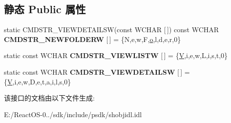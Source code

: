\subsection*{静态 Public 属性}
\begin{DoxyCompactItemize}
\item 
\mbox{\label{interface_i_context_menu_a5d0ee560d525fcbddbb6947d46f76c48}} 
static C\+M\+D\+S\+T\+R\+\_\+\+V\+I\+E\+W\+D\+E\+T\+A\+I\+L\+SW(const W\+C\+H\+AR \mbox{[}$\,$\mbox{]}) const W\+C\+H\+AR {\bfseries C\+M\+D\+S\+T\+R\+\_\+\+N\+E\+W\+F\+O\+L\+D\+E\+RW} \mbox{[}$\,$\mbox{]} = \{\textquotesingle{}N\textquotesingle{},\textquotesingle{}e\textquotesingle{},\textquotesingle{}w\textquotesingle{},\textquotesingle{}F\textquotesingle{},\textquotesingle{}\hyperlink{opengl_2mesa_2main_2extensions_8c_ac02068cf344ef10efe2778c164d1233e}{o}\textquotesingle{},\textquotesingle{}l\textquotesingle{},\textquotesingle{}d\textquotesingle{},\textquotesingle{}e\textquotesingle{},\textquotesingle{}r\textquotesingle{},0\}
\item 
\mbox{\label{interface_i_context_menu_ab6d577c816f91bb0d360512909248c36}} 
static const W\+C\+H\+AR {\bfseries C\+M\+D\+S\+T\+R\+\_\+\+V\+I\+E\+W\+L\+I\+S\+TW} \mbox{[}$\,$\mbox{]} = \{\textquotesingle{}\hyperlink{struct_v}{V}\textquotesingle{},\textquotesingle{}i\textquotesingle{},\textquotesingle{}e\textquotesingle{},\textquotesingle{}w\textquotesingle{},\textquotesingle{}L\textquotesingle{},\textquotesingle{}i\textquotesingle{},\textquotesingle{}s\textquotesingle{},\textquotesingle{}t\textquotesingle{},0\}
\item 
\mbox{\label{interface_i_context_menu_a9ac9c64b46a92b9cc343e620a1a0d5ba}} 
static const W\+C\+H\+AR {\bfseries C\+M\+D\+S\+T\+R\+\_\+\+V\+I\+E\+W\+D\+E\+T\+A\+I\+L\+SW} \mbox{[}$\,$\mbox{]} = \{\textquotesingle{}\hyperlink{struct_v}{V}\textquotesingle{},\textquotesingle{}i\textquotesingle{},\textquotesingle{}e\textquotesingle{},\textquotesingle{}w\textquotesingle{},\textquotesingle{}D\textquotesingle{},\textquotesingle{}e\textquotesingle{},\textquotesingle{}t\textquotesingle{},\textquotesingle{}a\textquotesingle{},\textquotesingle{}i\textquotesingle{},\textquotesingle{}l\textquotesingle{},\textquotesingle{}s\textquotesingle{},0\}
\end{DoxyCompactItemize}


该接口的文档由以下文件生成\+:\begin{DoxyCompactItemize}
\item 
E\+:/\+React\+O\+S-\/0../sdk/include/psdk/shobjidl.\+idl\end{DoxyCompactItemize}
